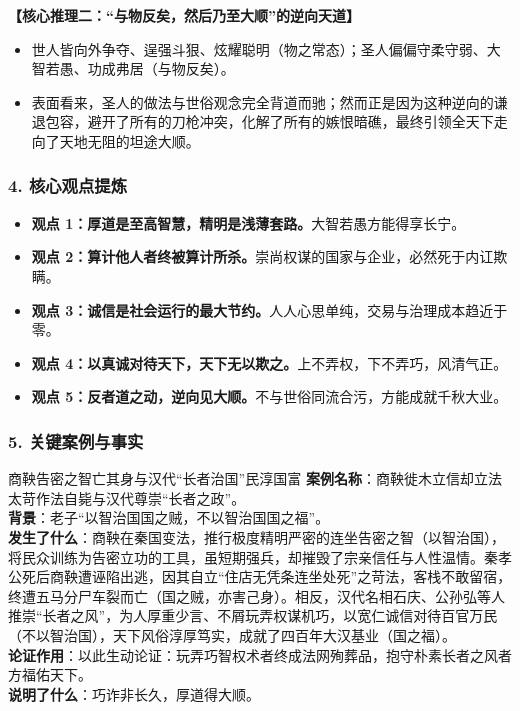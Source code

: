 \noindent\textbf{【核心推理二：“与物反矣，然后乃至大顺”的逆向天道】}
\begin{itemize}
    \item 世人皆向外争夺、逞强斗狠、炫耀聪明（物之常态）；圣人偏偏守柔守弱、大智若愚、功成弗居（与物反矣）。
    \item 表面看来，圣人的做法与世俗观念完全背道而驰；然而正是因为这种逆向的谦退包容，避开了所有的刀枪冲突，化解了所有的嫉恨暗礁，最终引领全天下走向了天地无阻的坦途大顺。
\end{itemize}

\subsubsection{4. 核心观点提炼}
\begin{itemize}
    \item \textbf{观点 1：厚道是至高智慧，精明是浅薄套路。}大智若愚方能得享长宁。
    \item \textbf{观点 2：算计他人者终被算计所杀。}崇尚权谋的国家与企业，必然死于内讧欺瞒。
    \item \textbf{观点 3：诚信是社会运行的最大节约。}人人心思单纯，交易与治理成本趋近于零。
    \item \textbf{观点 4：以真诚对待天下，天下无以欺之。}上不弄权，下不弄巧，风清气正。
    \item \textbf{观点 5：反者道之动，逆向见大顺。}不与世俗同流合污，方能成就千秋大业。
\end{itemize}

\subsubsection{5. 关键案例与事实}
\begin{CaseBox}{商鞅告密之智亡其身与汉代“长者治国”民淳国富}
\textbf{案例名称}：商鞅徙木立信却立法太苛作法自毙与汉代尊崇“长者之政”。\\
\textbf{背景}：老子“以智治国国之贼，不以智治国国之福”。\\
\textbf{发生了什么}：商鞅在秦国变法，推行极度精明严密的连坐告密之智（以智治国），将民众训练为告密立功的工具，虽短期强兵，却摧毁了宗亲信任与人性温情。秦孝公死后商鞅遭诬陷出逃，因其自立“住店无凭条连坐处死”之苛法，客栈不敢留宿，终遭五马分尸车裂而亡（国之贼，亦害己身）。相反，汉代名相石庆、公孙弘等人推崇“长者之风”，为人厚重少言、不屑玩弄权谋机巧，以宽仁诚信对待百官万民（不以智治国），天下风俗淳厚笃实，成就了四百年大汉基业（国之福）。\\
\textbf{论证作用}：以此生动论证：玩弄巧智权术者终成法网殉葬品，抱守朴素长者之风者方福佑天下。\\
\textbf{说明了什么}：巧诈非长久，厚道得大顺。
\end{CaseBox}

